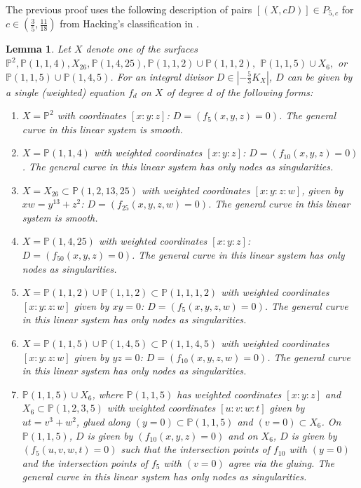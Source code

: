 \documentclass[11pt]{amsart}
\numberwithin{equation}{section}
\newtheorem{lemma}[theorem]{Lemma}
\theoremstyle{definition}
\newcommand{\bP}{\mathbb{P}}
\begin{document}
The previous proof uses the following description of pairs $[(X,cD)] \in P_{5,c}$ for $c \in(\frac{3}{5}, \frac{11}{18})$ from Hacking's classification in \cite{hacking}.

\begin{lemma}\label{lem:classificationdeg5}
    Let $X$ denote one of the surfaces $\bP^2, \bP(1,1,4), X_{26}, \bP(1,4,25), \bP(1,1,2) \cup \bP(1,1,2),$ $ \bP(1,1,5) \cup X_6,$ or $\bP(1,1,5) \cup \bP(1,4,5)$.  For an integral divisor $D \in |-\frac{5}{3}K_X|$, $D$ can be given by a single (weighted) equation $f_d$ on $X$ of degree $d$ of the following forms: 
        \begin{enumerate}
            \item $X = \bP^2$ with coordinates $[x:y:z]$: $D = (f_5(x,y,z) = 0)$.  The general curve in this linear system is smooth.
            \item $X = \bP(1,1,4)$ with weighted coordinates $[x:y:z]$: $D = (f_{10}(x,y,z) = 0)$.  The general curve in this linear system has only nodes as singularities.
            \item $X = X_{26} \subset \bP(1,2,13,25)$ with weighted coordinates $[x:y:z:w]$, given by $ xw = y^{13} + z^2 $: $D = (f_{25}(x,y,z,w) = 0)$.  The general curve in this linear system is smooth.
            \item $X = \bP(1,4,25)$ with weighted coordinates $[x:y:z]$: $D = (f_{50}(x,y,z) = 0)$. The general curve in this linear system has only nodes as singularities.
            \item $X = \bP(1,1,2) \cup \bP(1,1,2) \subset \bP(1,1,1,2)$ with weighted coordinates $[x:y:z:w]$ given by $xy = 0$: $D = (f_5(x,y,z,w) = 0)$.   The general curve in this linear system has only nodes as singularities.
            \item $X = \bP(1,1,5) \cup \bP(1,4,5) \subset \bP(1,1,4,5)$ with weighted coordinates $[x:y:z:w]$ given by $yz = 0$: $D = (f_{10}(x,y,z,w) = 0)$. The general curve in this linear system has only nodes as singularities.
            \item $\bP(1,1,5) \cup X_6$, where $\bP(1,1,5)$ has weighted coordinates $[x:y:z]$ and $X_6 \subset \bP(1,2,3,5)$ with weighted coordinates $[u:v:w:t]$ given by $ut = v^3 + w^2$, glued along $(y = 0) \subset \bP(1,1,5)$ and $(v = 0) \subset X_6$.  On $\bP(1,1,5)$, $D$ is given by $(f_{10}(x,y,z) = 0)$ and on $X_6$, $D$ is given by $(f_5(u,v,w,t) = 0)$ such that the intersection points of $f_{10}$ with $(y = 0)$ and the intersection points of $f_5$ with $(v = 0)$ agree via the gluing. The general curve in this linear system has only nodes as singularities.
        \end{enumerate}
\end{lemma}
\end{document}
